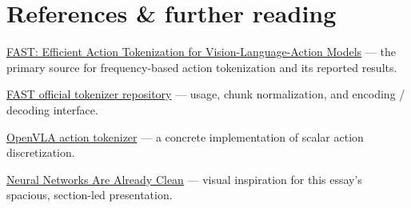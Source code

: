 \section{References \& further reading}

\href{https://arxiv.org/abs/2501.09747}{FAST: Efficient Action Tokenization for
Vision-Language-Action Models} — the primary source for frequency-based action
tokenization and its reported results.

\href{https://huggingface.co/physical-intelligence/fast}{FAST official tokenizer
repository} — usage, chunk normalization, and encoding / decoding interface.

\href{https://github.com/openvla/openvla/blob/main/prismatic/vla/action_tokenizer.py}{OpenVLA
action tokenizer} — a concrete implementation of scalar action discretization.

\href{https://already-clean.goodfire.com/}{Neural Networks Are Already Clean} —
visual inspiration for this essay’s spacious, section-led presentation.
